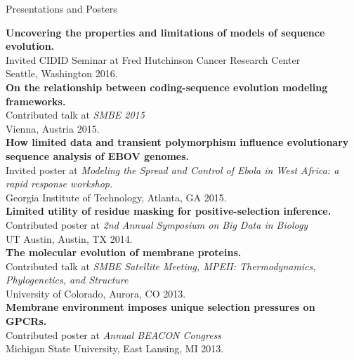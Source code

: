 \documentclass{resume} %
\begin{document}




\vspace*{0.5cm}
\begin{rSection}{Presentations and Posters}
\vspace*{0.25cm}


\textbf{Uncovering the properties and limitations of models of sequence evolution.}
\\Invited CIDID Seminar at Fred Hutchinson Cancer Research Center
\\ Seattle, Washington 2016.\\


\textbf{On the relationship between coding-sequence evolution modeling frameworks.}
\\Contributed talk at \emph{SMBE 2015}
\\ Vienna, Austria 2015.\\


\textbf{How limited data and transient polymorphism influence evolutionary sequence analysis of EBOV genomes.}
\\Invited poster at \emph{Modeling the Spread and Control of Ebola in West Africa: a rapid response workshop.}
\\ Georgia Institute of Technology, Atlanta, GA 2015.\\

\textbf{Limited utility of residue masking for positive-selection inference.}
\\Contributed poster at \emph{2nd Annual Symposium on Big Data in Biology}
\\ UT Austin, Austin, TX 2014.\\

\textbf{The molecular evolution of membrane proteins.}
\\Contributed talk at \emph{SMBE Satellite Meeting, MPEII: Thermodynamics, Phylogenetics, and Structure}
\\ University of Colorado, Aurora, CO 2013.\\

\textbf{Membrane environment imposes unique selection pressures on GPCRs.}
\\Contributed poster at \emph{Annual BEACON Congress}
\\ Michigan State University, East Lansing, MI 2013.


\end{rSection}
\end{document}
